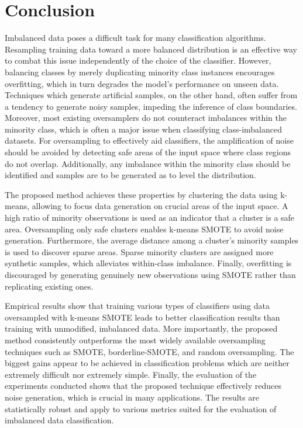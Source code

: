 \documentclass[sort&compress]{elsarticle}
\begin{document}
\section{Conclusion}
\label{sec:conclusion}
Imbalanced data poses a difficult task for many classification algorithms.
Resampling training data toward a more balanced distribution is an effective way
to combat this issue independently of the choice of the classifier. However,
balancing classes by merely duplicating minority class instances encourages
overfitting, which in turn degrades the model's performance on unseen data.
Techniques which generate artificial samples, on the other hand, often suffer
from a tendency to generate noisy samples, impeding the inference of class
boundaries. Moreover, most existing oversamplers do not counteract imbalances
within the minority class, which is often a major issue when classifying
class-imbalanced datasets. For oversampling to effectively aid classifiers, the
amplification of noise should be avoided by detecting safe areas of the input
space where class regions do not overlap. Additionally, any imbalance within the
minority class should be identified and samples are to be generated as to level
the distribution.

The proposed method achieves these properties by clustering the data using
k-means, allowing to focus data generation on crucial areas of the input space.
A high ratio of minority observations is used as an indicator that a cluster is
a safe area. Oversampling only safe clusters enables k-means \ac{SMOTE} to avoid
noise generation. Furthermore, the average distance among a cluster's minority
samples is used to discover sparse areas. Sparse minority clusters are assigned
more synthetic samples, which alleviates within-class imbalance. Finally,
overfitting is discouraged by generating genuinely new observations using
\ac{SMOTE} rather than replicating existing ones.

Empirical results show that training various types of classifiers using data
oversampled with k-means \ac{SMOTE} leads to better classification results than
training with unmodified, imbalanced data. More importantly, the proposed method
consistently outperforms the most widely available oversampling techniques such
as \ac{SMOTE}, borderline-\ac{SMOTE}, and random oversampling. The biggest gains
appear to be achieved in classification problems which are neither extremely
difficult nor extremely simple. Finally, the evaluation of the experiments
conducted shows that the proposed technique effectively reduces noise
generation, which is crucial in many applications. The results are statistically
robust and apply to various metrics suited for the evaluation of imbalanced data
classification.
\end{document}
